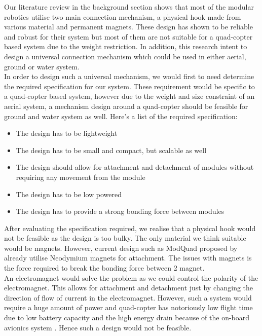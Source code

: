 \documentclass[12pt,A4]{article}
\begin{document}
	Our literature review in the background section shows that most of the modular robotics utilise two main connection mechanism, a physical hook made from various material and permanent magnets. These design has shown to be reliable and robust for their system but most of them are not suitable for a quad-copter based system due to the weight restriction. In addition, this research intent to design a universal connection mechanism which could be used in either aerial, ground or water system.\\
	
	In order to design such a universal mechanism, we would first to need determine the required specification for our system. These requirement would be specific to a quad-copter based system, however due to the weight and size constraint of an aerial system, a mechanism design around a quad-copter should be feasible for ground and water system as well. Here's a list of the required specification:
	
	\begin{itemize}
		\item The design has to be lightweight
		\item The design has to be small and compact, but scalable as well
		\item The design should allow for attachment and detachment of modules without requiring any movement from the module
		\item The design has to be low powered
		\item The design has to provide a strong bonding force between modules
	\end{itemize}
	
	After evaluating the specification required, we realise that a physical hook would not be feasible as the design is too bulky. The only material we think suitable would be magnets. However, current design such as ModQuad proposed by \citep{saldana2018modquad} already utilise Neodymium magnets for attachment. The issues with magnets is the force required to break the bonding force between 2 magnet. \\
	
	An electromagnet would solve the problem as we could control the polarity of the electromagnet. This allows for attachment and detachment just by changing the direction of flow of current in the electromagnet. However, such a system would require a huge amount of power and quad-copter has notoriously low flight time due to low battery capacity and the high energy drain because of the on-board avionics system \citep{lee2015autonomous}. Hence such a design would not be feasible.\\
	
\end{document}
